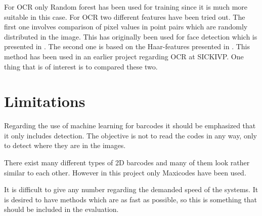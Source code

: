 For OCR only Random forest has been used for training since it is much more suitable in this case. For OCR two different features have been tried out. The first one involves comparison of pixel values in point pairs which are randomly distributed in the image. This has originally been used for face detection which is presented in \citep{Nenad}. The second one is based on the Haar-features presented in \citep{Viola:2010}. This method has been used in an earlier project regarding OCR at SICKIVP. One thing that is of interest is to compared these two.
 
\section{Limitations}
Regarding the use of machine learning for barcodes it should be emphasized that it only includes detection. The objective is not to read the codes in any way, only to detect where they are in the images.
 
There exist many different types of 2D barcodes and many of them look rather similar to each other. However in this project only Maxicodes have been used.

It is difficult to give any number regarding the demanded speed of the systems. It is desired to have methods which are as fast as possible, so this is something that should be included in the evaluation. 


